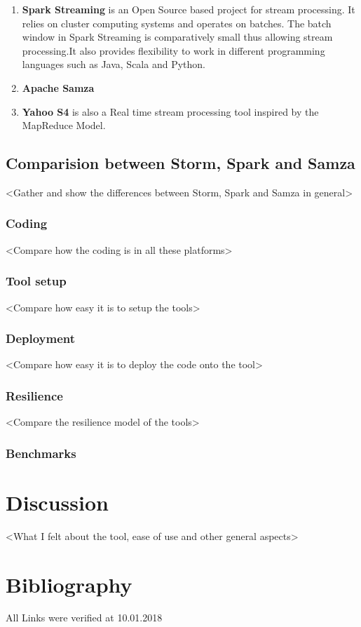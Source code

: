 \documentclass[runningheads,a4paper]{llncs}[2015/06/24]
\begin{document}
 \begin{enumerate}
 \item \textbf{Spark Streaming} is an Open Source based project for stream processing.  It relies on cluster computing systems and operates on batches. The batch window in Spark Streaming is comparatively small thus allowing stream processing.It also provides flexibility to work in different programming languages such as Java, Scala and Python.
 \item \textbf{Apache Samza} 
 \item \textbf{Yahoo S4} is also a Real time stream processing tool inspired by the MapReduce Model.
 \end{enumerate}
 
 \subsection{Comparision between Storm, Spark and Samza}
 
 <Gather and show the differences between Storm, Spark and Samza in general>
 
 \subsubsection{Coding}
 <Compare how the coding is in all these platforms>
 
 \subsubsection{Tool setup}
 <Compare how easy it is to setup the tools>
 
 \subsubsection{Deployment}
 <Compare how easy it is to deploy the code onto the tool>
 
 \subsubsection{Resilience}
 <Compare the resilience model of the tools>
 
 \subsubsection{Benchmarks}
 
 \section{Discussion}
<What I felt about the tool, ease of use and other general aspects>



\section{Bibliography}


All Links were verified at 10.01.2018
\end{document}
